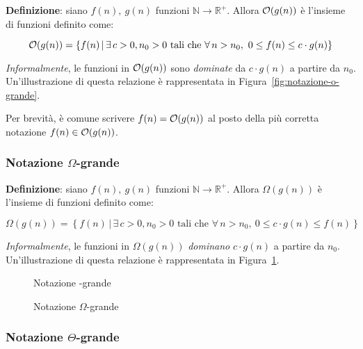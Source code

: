 \documentclass[italian, 10pt]{article}
\begin{document}
\textbf{Definizione}: siano \(f(n),\ g(n)\) funzioni \(\mathbb{N} \rightarrow \mathbb{R}^+\).
Allora \(\mathcal{O}(g(n))\) è l'insieme di funzioni definito come:

\[ \mathcal{O}(g(n)) = \left\{ f(n) \, | \, \exists \, c > 0, n_0 > 0 \text{ tali che } \forall \, n > n_0, \ 0 \leq f(n) \leq c \cdot g(n) \right\} \]

\bigskip
\textit{Informalmente}, le funzioni in \(\mathcal{O}(g(n))\) sono \textit{dominate} da \(c \cdot g(n)\) a partire da \(n_0\).
Un'illustrazione di questa relazione è rappresentata in Figura~\ref{fig:notazione-o-grande}.

\bigskip
Per brevità, è comune scrivere \(f(n) = \mathcal{O}(g(n))\) al posto della più corretta notazione \(f(n) \in \mathcal{O}(g(n))\).

\subsubsection[Notazione Omega-grande]{Notazione \(\Omega\)-grande}

\textbf{Definizione}: siano \(f(n),\ g(n)\) funzioni \(\mathbb{N} \rightarrow \mathbb{R}^+\).
Allora \(\Omega(g(n))\) è l'insieme di funzioni definito come:

\[ \Omega(g(n)) = \left\{ f(n) \, | \, \exists \, c > 0, n_0 > 0 \text{ tali che } \forall \, n > n_0, \ 0 \leq c \cdot g(n) \leq f(n)  \right\} \]

\bigskip
\textit{Informalmente}, le funzioni in \(\Omega(g(n))\) \textit{dominano}  \(c \cdot g(n)\) a partire da \(n_0\).
Un'illustrazione di questa relazione è rappresentata in Figura~\ref{fig:notazione-omega-grande}.

\begin{figure}[htbp]
  \bigskip
  \centering
  \begin{minipage}[b]{0.45\textwidth}
    \centering
    \caption{Notazione \bigO-grande}
    \label{fig:notazione-o-grande}
  \end{minipage}
  \begin{minipage}[b]{0.45\textwidth}
    \centering
    \caption{Notazione \(\Omega\)-grande}
    \label{fig:notazione-omega-grande}
  \end{minipage}
  \bigskip
\end{figure}

\subsubsection[Notazione Theta-grande]{Notazione \(\Theta\)-grande}
\end{document}
